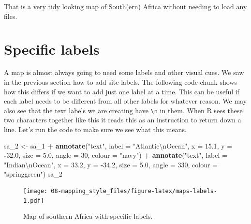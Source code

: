 \documentclass[]{book}
\newenvironment{Shaded}{\begin{snugshade}}{\end{snugshade}}
\newcommand{\KeywordTok}[1]{\textcolor[rgb]{0.13,0.29,0.53}{\textbf{#1}}}
\newcommand{\DataTypeTok}[1]{\textcolor[rgb]{0.13,0.29,0.53}{#1}}
\newcommand{\DecValTok}[1]{\textcolor[rgb]{0.00,0.00,0.81}{#1}}
\newcommand{\FloatTok}[1]{\textcolor[rgb]{0.00,0.00,0.81}{#1}}
\newcommand{\CharTok}[1]{\textcolor[rgb]{0.31,0.60,0.02}{#1}}
\newcommand{\StringTok}[1]{\textcolor[rgb]{0.31,0.60,0.02}{#1}}
\newcommand{\OperatorTok}[1]{\textcolor[rgb]{0.81,0.36,0.00}{\textbf{#1}}}
\newcommand{\NormalTok}[1]{#1}
\theoremstyle{definition}
\theoremstyle{definition}
\theoremstyle{definition}
\theoremstyle{remark}
\begin{document}
That is a very tidy looking map of South(ern) Africa without needing to
load any files.

\section{Specific labels}\label{specific-labels}

A map is almost always going to need some labels and other visual cues.
We saw in the previous section how to add site labels. The following
code chunk shows how this differs if we want to add just one label at a
time. This can be useful if each label needs to be different from all
other labels for whatever reason. We may also see that the text labels
we are creating have \texttt{\textbackslash{}n} in them. When R sees
these two characters together like this it reads this as an instruction
to return down a line. Let's run the code to make sure we see what this
means.

\begin{Shaded}
\begin{Highlighting}[]
\NormalTok{sa_}\DecValTok{2}\NormalTok{ <-}\StringTok{ }\NormalTok{sa_}\DecValTok{1} \OperatorTok{+}
\StringTok{  }\KeywordTok{annotate}\NormalTok{(}\StringTok{"text"}\NormalTok{, }\DataTypeTok{label =} \StringTok{"Atlantic}\CharTok{\textbackslash{}n}\StringTok{Ocean"}\NormalTok{, }
           \DataTypeTok{x =} \FloatTok{15.1}\NormalTok{, }\DataTypeTok{y =} \OperatorTok{-}\FloatTok{32.0}\NormalTok{, }
           \DataTypeTok{size =} \FloatTok{5.0}\NormalTok{, }
           \DataTypeTok{angle =} \DecValTok{30}\NormalTok{, }
           \DataTypeTok{colour =} \StringTok{"navy"}\NormalTok{) }\OperatorTok{+}
\StringTok{  }\KeywordTok{annotate}\NormalTok{(}\StringTok{"text"}\NormalTok{, }\DataTypeTok{label =} \StringTok{"Indian}\CharTok{\textbackslash{}n}\StringTok{Ocean"}\NormalTok{, }
           \DataTypeTok{x =} \FloatTok{33.2}\NormalTok{, }\DataTypeTok{y =} \OperatorTok{-}\FloatTok{34.2}\NormalTok{, }
           \DataTypeTok{size =} \FloatTok{5.0}\NormalTok{, }
           \DataTypeTok{angle =} \DecValTok{330}\NormalTok{, }
           \DataTypeTok{colour =} \StringTok{"springgreen"}\NormalTok{)}
\NormalTok{sa_}\DecValTok{2}
\end{Highlighting}
\end{Shaded}

\begin{figure}
\centering
\texttt{[image: 08-mapping\_style\_files/figure-latex/maps-labels-1.pdf]}
\caption{\label{fig:maps-labels}Map of southern Africa with specific
labels.}
\end{figure}
\end{document}
